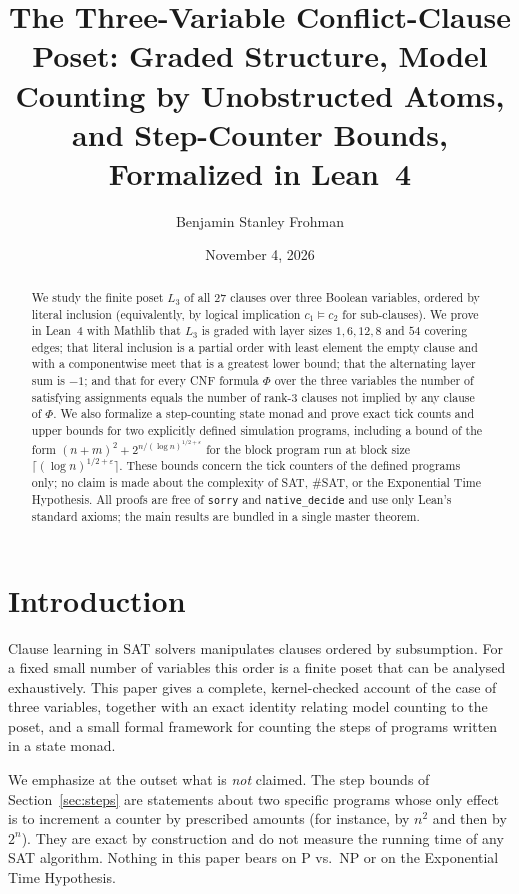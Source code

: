 \documentclass[11pt]{amsart}
\title[The three-variable conflict-clause lattice]{The Three-Variable Conflict-Clause Poset: Graded Structure, Model Counting by Unobstructed Atoms, and Step-Counter Bounds, Formalized in Lean~4}
\author{Benjamin Stanley Frohman}
\date{November 4, 2026}
\theoremstyle{definition}
\theoremstyle{remark}
\begin{document}
\begin{abstract}
We study the finite poset $L_3$ of all $27$ clauses over three Boolean variables, ordered by literal inclusion (equivalently, by logical implication $c_1\models c_2$ for sub-clauses). We prove in Lean~4 with Mathlib that $L_3$ is graded with layer sizes $1,6,12,8$ and $54$ covering edges; that literal inclusion is a partial order with least element the empty clause and with a componentwise meet that is a greatest lower bound; that the alternating layer sum is $-1$; and that for every CNF formula $\Phi$ over the three variables the number of satisfying assignments equals the number of rank-$3$ clauses not implied by any clause of $\Phi$. We also formalize a step-counting state monad and prove exact tick counts and upper bounds for two explicitly defined simulation programs, including a bound of the form $(n+m)^2+2^{n/(\log n)^{1/2+\varepsilon}}$ for the block program run at block size $\lceil(\log n)^{1/2+\varepsilon}\rceil$. These bounds concern the tick counters of the defined programs only; no claim is made about the complexity of SAT, \#SAT, or the Exponential Time Hypothesis. All proofs are free of \texttt{sorry} and \texttt{native\_decide} and use only Lean's standard axioms; the main results are bundled in a single master theorem.
\end{abstract}
\maketitle
{}\par


\section{Introduction}
Clause learning in SAT solvers manipulates clauses ordered by subsumption. For a fixed small number of variables this order is a finite poset that can be analysed exhaustively. This paper gives a complete, kernel-checked account of the case of three variables, together with an exact identity relating model counting to the poset, and a small formal framework for counting the steps of programs written in a state monad.

We emphasize at the outset what is \emph{not} claimed. The step bounds of Section~\ref{sec:steps} are statements about two specific programs whose only effect is to increment a counter by prescribed amounts (for instance, by $n^2$ and then by $2^n$). They are exact by construction and do not measure the running time of any SAT algorithm. Nothing in this paper bears on P vs.\ NP or on the Exponential Time Hypothesis.
\end{document}
